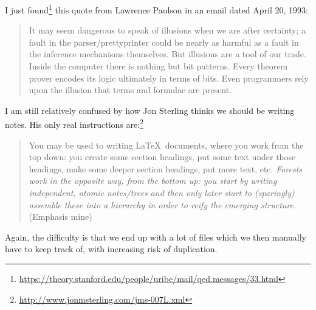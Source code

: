 \begin{node}\label{amn-0008}%
I just found\footnote{\url{https://theory.stanford.edu/people/uribe/mail/qed.messages/33.html}} this quote from Lawrence Paulson
in an email dated April 20, 1993:
\begin{quote}
It may seem dangerous to speak of illusions when we are after certainty; a
fault in the parser/prettyprinter could be nearly as harmful as a fault in the
inference mechanisms themselves.  But illusions are a tool of our trade. 
Inside the computer there is nothing but bit patterns.  Every theorem prover
encodes its logic ultimately in terms of bits.  Even programmers rely upon the
illusion that terms and formulae are present.
\end{quote}
\end{node}

\begin{node}\label{amn-0009}%
I am still relatively confused by how Jon Sterling thinks we should be
writing notes. His only real instructions are:\footnote{\url{http://www.jonmsterling.com/jms-007L.xml}}
\begin{quote}
You may be used to writing \LaTeX\ documents, where you work from the top down: you create some section headings, put some text under those headings, make some deeper section headings, put more text, etc.
\emph{Forests work in the opposite way, from the bottom up: you start by writing independent, atomic notes/trees and then only later start to (sparingly) assemble these into a hierarchy in order to reify the emerging structure.}
(Emphasis mine)
\end{quote}
Again, the difficulty is that we end up with a lot of files which we
then manually have to keep track of, with increasing risk of duplication.
\end{node}

